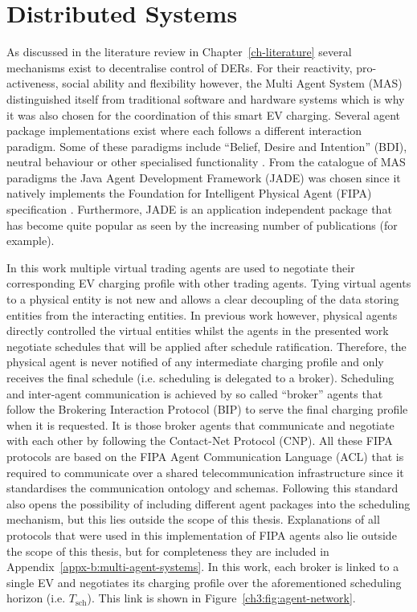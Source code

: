 \section{Distributed Systems}
\label{ch3:sec:distributed-systems}

As discussed in the literature review in Chapter~\ref{ch-literature} several mechanisms exist to decentralise control of DERs.
For their reactivity, pro-activeness, social ability and flexibility however, the Multi Agent System (MAS) distinguished itself from traditional software and hardware systems which is why it was also chosen for the coordination of this smart EV charging.
Several agent package implementations exist where each follows a different interaction paradigm.
Some of these paradigms include ``Belief, Desire and Intention'' (BDI), neutral behaviour or other specialised functionality \cite{Luck2004}.
From the catalogue of MAS paradigms the Java Agent Development Framework (JADE) was chosen since it natively implements the Foundation for Intelligent Physical Agent (FIPA) specification \cite{JADE-website, FIPA-agent-specs}.
Furthermore, JADE is an application independent package that has become quite popular as seen by the increasing number of publications (for example\cite{Karfopoulos2013, Eddy2011, Kuo2013, Mocci2014, Li2017}).

In this work multiple virtual trading agents are used to negotiate their corresponding EV charging profile with other trading agents.
Tying virtual agents to a physical entity is not new \cite{Dimeas2005, Nguyen2011, Nagata2011, Nagata2012} and allows a clear decoupling of the data storing entities from the interacting entities.
In previous work however, physical agents directly controlled the virtual entities whilst the agents in the presented work negotiate schedules that will be applied after schedule ratification.
Therefore, the physical agent is never notified of any intermediate charging profile and only receives the final schedule (i.e. scheduling is delegated to a broker).
Scheduling and inter-agent communication is achieved by so called ``broker'' agents that follow the Brokering Interaction Protocol (BIP) to serve the final charging profile when it is requested.
It is those broker agents that communicate and negotiate with each other by following the Contact-Net Protocol (CNP).
All these FIPA protocols are based on the FIPA Agent Communication Language (ACL) that is required to communicate over a shared telecommunication infrastructure since it standardises the communication ontology and schemas.
Following this standard also opens the possibility of including different agent packages into the scheduling mechanism, but this lies outside the scope of this thesis.
Explanations of all protocols that were used in this implementation of FIPA agents also lie outside the scope of this thesis, but for completeness they are included in Appendix~\ref{appx-b:multi-agent-systems}.
In this work, each broker is linked to a single EV and negotiates its charging profile over the aforementioned scheduling horizon (i.e. $T_\text{sch}$).
This link is shown in Figure~\ref{ch3:fig:agent-network}.

